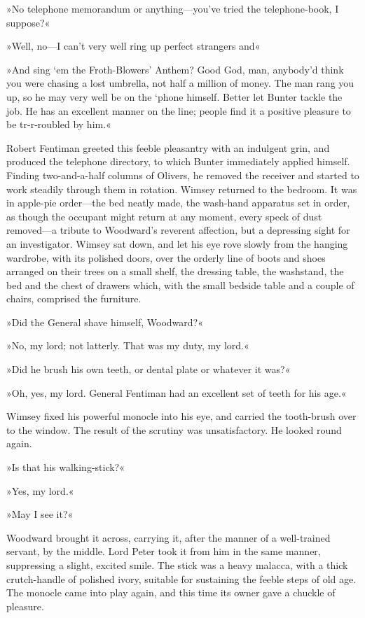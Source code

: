 »No telephone memorandum or anything—you've tried the telephone-book, I suppose?«

»Well, no—I can't very well ring up perfect strangers and\longdash«

»And sing `em the Froth-Blowers' Anthem? Good God, man, anybody'd think you were chasing a lost umbrella, not half a million of money. The man rang you up, so he may very well be on the `phone himself. Better let Bunter tackle the job. He has an excellent manner on the line; people find it a positive pleasure to be tr-r-roubled by him.«

Robert Fentiman greeted this feeble pleasantry with an indulgent grin, and produced the telephone directory, to which Bunter immediately applied himself. Finding two-and-a-half columns of Olivers, he removed the receiver and started to work steadily through them in rotation. Wimsey returned to the bedroom. It was in apple-pie order—the bed neatly made, the wash-hand apparatus set in order, as though the occupant might return at any moment, every speck of dust removed—a tribute to Woodward's reverent affection, but a depressing sight for an investigator. Wimsey sat down, and let his eye rove slowly from the hanging wardrobe, with its polished doors, over the orderly line of boots and shoes arranged on their trees on a small shelf, the dressing table, the washstand, the bed and the chest of drawers which, with the small bedside table and a couple of chairs, comprised the furniture.

»Did the General shave himself, Woodward?«

»No, my lord; not latterly. That was my duty, my lord.«

»Did he brush his own teeth, or dental plate or whatever it was?«

»Oh, yes, my lord. General Fentiman had an excellent set of teeth for his age.«

Wimsey fixed his powerful monocle into his eye, and carried the tooth-brush over to the window. The result of the scrutiny was unsatisfactory. He looked round again.

»Is that his walking-stick?«

»Yes, my lord.«

»May I see it?«

Woodward brought it across, carrying it, after the manner of a well-trained servant, by the middle. Lord Peter took it from him in the same manner, suppressing a slight, excited smile. The stick was a heavy malacca, with a thick crutch-handle of polished ivory, suitable for sustaining the feeble steps of old age. The monocle came into play again, and this time its owner gave a chuckle of pleasure.

